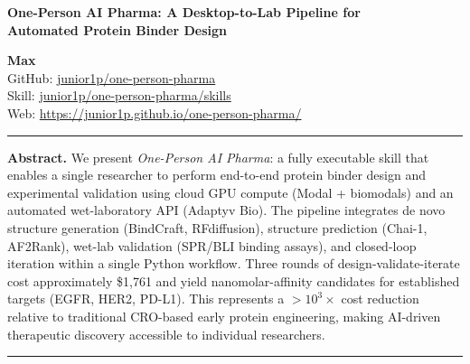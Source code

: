 \documentclass[12pt,a4paper]{article}
\begin{document}
\begin{center}
  \Large\bfseries
  One-Person AI Pharma: A Desktop-to-Lab Pipeline for \\[3pt]
  Automated Protein Binder Design
\end{center}

\vspace{1.5em}

\begin{center}
  \textbf{Max} \\[4pt]
  \normalsize
  GitHub: \href{https://github.com/junior1p/one-person-pharma}{junior1p/one-person-pharma} \\[4pt]
  Skill: \href{https://github.com/junior1p/one-person-pharma/tree/main/skills}{junior1p/one-person-pharma/skills} \\[4pt]
  Web: \url{https://junior1p.github.io/one-person-pharma/}
\end{center}

\vspace{1em}

\hrule
\vspace{1em}

\noindent\textbf{Abstract.}
We present \emph{One-Person AI Pharma}: a fully executable skill that enables
a single researcher to perform end-to-end protein binder design and experimental
validation using cloud GPU compute (Modal + biomodals) and an automated
wet-laboratory API (Adaptyv Bio). The pipeline integrates de novo structure
generation (BindCraft, RFdiffusion), structure prediction (Chai-1, AF2Rank),
wet-lab validation (SPR/BLI binding assays), and closed-loop iteration within a
single Python workflow. Three rounds of design-validate-iterate cost
approximately \$1,761 and yield nanomolar-affinity candidates for established
targets (EGFR, HER2, PD-L1). This represents a $>10^3\times$ cost reduction
relative to traditional CRO-based early protein engineering, making
AI-driven therapeutic discovery accessible to individual researchers.

\vspace{1em}
\hrule
\vspace{1.5em}

\end{document}
